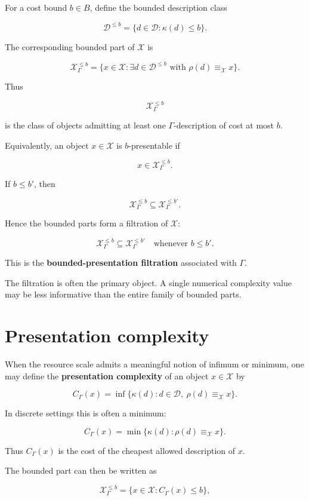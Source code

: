 \documentclass[11pt]{article}
\begin{document}
For a cost bound \(b\in B\), define the bounded description class

\[
\mathcal D^{\leq b}=\{d\in\mathcal D:\kappa(d)\leq b\}.
\]

The corresponding bounded part of \(\mathcal X\) is

\[
\mathcal X_\Gamma^{\leq b}
=
\{x\in\mathcal X:\exists d\in\mathcal D^{\leq b}
\text{ with }\rho(d)\equiv_\mathcal X x\}.
\]

Thus

\[
\mathcal X_\Gamma^{\leq b}
\]

is the class of objects admitting at least one \(\Gamma\)-description of cost at most \(b\).

Equivalently, an object \(x\in\mathcal X\) is \(b\)-presentable if

\[
x\in \mathcal X_\Gamma^{\leq b}.
\]

If \(b\leq b'\), then

\[
\mathcal X_\Gamma^{\leq b}\subseteq \mathcal X_\Gamma^{\leq b'}.
\]

Hence the bounded parts form a filtration of \(\mathcal X\):

\[
\mathcal X_\Gamma^{\leq b}
\subseteq
\mathcal X_\Gamma^{\leq b'}
\quad
\text{whenever }b\leq b'.
\]

This is the \textbf{bounded-presentation filtration} associated with \(\Gamma\).

The filtration is often the primary object. A single numerical complexity value may be less informative than the entire family of bounded parts.


\section{Presentation complexity}

When the resource scale admits a meaningful notion of infimum or minimum, one may define the \textbf{presentation complexity} of an object \(x\in\mathcal X\) by

\[
C_\Gamma(x)=\inf\{\kappa(d): d\in\mathcal D,\ \rho(d)\equiv_\mathcal X x\}.
\]

In discrete settings this is often a minimum:

\[
C_\Gamma(x)=\min\{\kappa(d):\rho(d)\equiv_\mathcal X x\}.
\]

Thus \(C_\Gamma(x)\) is the cost of the cheapest allowed description of \(x\).

The bounded part can then be written as

\[
\mathcal X_\Gamma^{\leq b}=\{x\in\mathcal X:C_\Gamma(x)\leq b\},
\]
\end{document}
